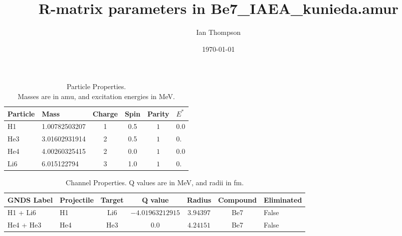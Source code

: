 \documentclass[aps]{revtex4}
\begin{document}
\title{ R-matrix parameters in Be7\_IAEA\_kunieda.amur }
\author{Ian Thompson} 
\date{ \today }
\maketitle
         
\begin{table}[h] 
\caption{ Particle Properties. \\ Masses are in amu, and excitation energies in MeV. } 
\begin{tabular}{| llcc c l |} 
\hline\hline 
Particle & Mass & Charge & Spin & Parity & $E^*$  \\ 
\hline 
 H1 & 1.00782503207 & 1 & 0.5 & $1$ & $0.0$ \\ 
 He3 & 3.01602931914 & 2 & 0.5 & $1$ & $0.$ \\ 
 He4 & 4.00260325415 & 2 & 0.0 & $1$ & $0.0$ \\ 
 Li6 & 6.015122794 & 3 & 1.0 & $1$ & $0.$ \\ 
\hline
 \end{tabular}
 \end{table}

 
\begin{table}[h] 
\caption{ Channel Properties. Q values are in MeV, and radii in fm.} 
\begin{tabular}{| llccc c l |} 
\hline\hline 
GNDS Label   & Projectile & Target & Q value  & Radius & Compound & Eliminated  \\ 
\hline 
 H1 + Li6 & H1 & Li6 & $-4.01963212915$ & $3.94397$ & Be7 & False \\ 
 He4 + He3 & He4 & He3 & $0.0$ & $4.24151$ & Be7 & False \\ 
\hline
 \end{tabular}
 \end{table}
\end{document}
